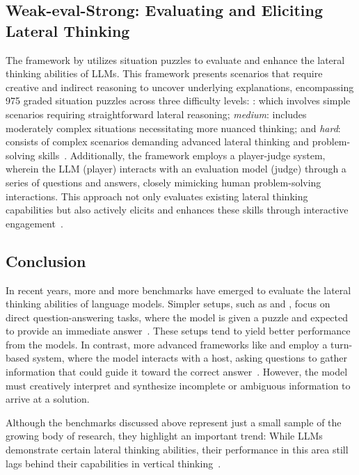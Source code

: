 \subsection{Weak-eval-Strong: Evaluating and Eliciting Lateral Thinking}

The  framework by \textcite{chenWeakevalStrongEvaluatingEliciting2024} utilizes situation puzzles to evaluate and enhance the lateral thinking abilities of \acp{LLM}. This framework presents scenarios that require creative and indirect reasoning to uncover underlying explanations, encompassing 975 graded situation puzzles across three difficulty levels: : which involves simple scenarios requiring straightforward lateral reasoning; \textit{medium}: includes moderately complex situations necessitating more nuanced thinking; and \textit{hard}: consists of complex scenarios demanding advanced lateral thinking and problem-solving skills~\cite{chenWeakevalStrongEvaluatingEliciting2024}. Additionally, the framework employs a player-judge system, wherein the LLM (player) interacts with an evaluation model (judge) through a series of questions and answers, closely mimicking human problem-solving interactions. This approach not only evaluates existing lateral thinking capabilities but also actively elicits and enhances these skills through interactive engagement~\cite{chenWeakevalStrongEvaluatingEliciting2024}.

\subsection{Conclusion}

In recent years, more and more benchmarks have emerged to evaluate the lateral thinking abilities of language models. Simpler setups, such as  and , focus on direct question-answering tasks, where the model is given a puzzle and expected to provide an immediate answer~\cite{linRiddleSenseReasoningRiddle2021, jiangBRAINTEASERLateralThinking2023}. These setups tend to yield better performance from the models. In contrast, more advanced frameworks like  and  employ a turn-based system, where the model interacts with a host, asking questions to gather information that could guide it toward the correct answer~\cite{huangLatEvalInteractiveLLMs2024, chenWeakevalStrongEvaluatingEliciting2024}. However, the model must creatively interpret and synthesize incomplete or ambiguous information to arrive at a solution.

Although the benchmarks discussed above represent just a small sample of the growing body of research, they highlight an important trend: While \acp{LLM} demonstrate certain lateral thinking abilities, their performance in this area still lags behind their capabilities in vertical thinking~\cite{linRiddleSenseReasoningRiddle2021, jiangBRAINTEASERLateralThinking2023, huangLatEvalInteractiveLLMs2024,chenWeakevalStrongEvaluatingEliciting2024}.
